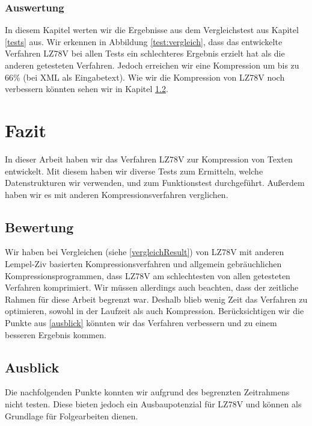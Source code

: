 \documentclass[a4paper,11pt]{scrartcl}%
\theoremstyle{change}
\theoremstyle{nonumberplain}
\theoremstyle{change}
\theoremstyle{nonumberplain}
\theoremstyle{change}
\theoremstyle{nonumberplain}
\begin{document}
\subsubsection{Auswertung}

In diesem Kapitel werten wir die Ergebnisse aus dem Vergleichstest aus Kapitel \ref{tests} aus. Wir erkennen in Abbildung \ref{test:vergleich}, dass das entwickelte Verfahren LZ78V bei allen Tests ein schlechteres Ergebnis erzielt hat als die anderen getesteten Verfahren. Jedoch erreichen wir eine Kompression um bis zu 66\% (bei XML als Eingabetext).
Wie wir die Kompression von LZ78V noch verbessern könnten sehen wir in Kapitel \ref{ausblick}.

\section{Fazit}

In dieser Arbeit haben wir das Verfahren LZ78V zur Kompression von Texten entwickelt. Mit diesem haben wir diverse Tests zum Ermitteln, welche Datenstrukturen wir verwenden, und zum Funktionstest durchgeführt. Außerdem haben wir es mit anderen Kompressionsverfahren verglichen.

\subsection{Bewertung}

Wir haben bei Vergleichen (siehe \autoref{vergleichResult}) von LZ78V mit anderen Lempel-Ziv basierten Kompressionsverfahren und allgemein gebräuchlichen Kompressionsprogrammen, dass LZ78V am schlechtesten von allen getesteten Verfahren komprimiert.
\newline
\newline
Wir müssen allerdings auch beachten, dass der zeitliche Rahmen für diese Arbeit begrenzt war. Deshalb blieb wenig Zeit das Verfahren zu optimieren, sowohl in der Laufzeit als auch Kompression. Berücksichtigen wir die Punkte aus \autoref{ausblick} könnten wir das Verfahren verbessern und zu einem besseren Ergebnis kommen.

\subsection{Ausblick} \label{ausblick}

Die nachfolgenden Punkte konnten wir aufgrund des begrenzten Zeitrahmens nicht testen. Diese bieten jedoch ein Ausbaupotenzial für LZ78V und können als Grundlage für Folgearbeiten dienen.
\end{document}
